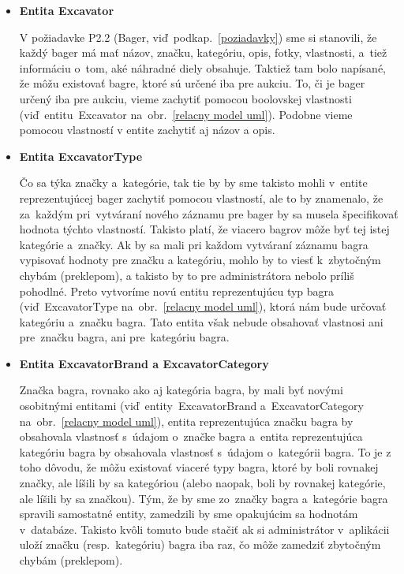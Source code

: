 \begin{itemize}
\item \textbf{Entita Excavator}

V požiadavke P2.2 (Bager, viď~podkap.~\ref{poziadavky}) sme si stanovili, že každý bager má mať názov, značku, kategóriu, opis, fotky, vlastnosti, a~tiež informáciu o~tom, aké náhradné diely obsahuje. Taktiež tam bolo napísané, že môžu existovať bagre, ktoré sú určené iba pre aukciu. To, či je bager určený iba pre aukciu, vieme zachytiť pomocou boolovskej vlastnosti (viď~entitu~Excavator na~obr.~\ref{relacny model uml}). Podobne vieme pomocou vlastností v entite zachytiť aj názov a opis.

\item \textbf{Entita ExcavatorType}

Čo sa týka značky a~kategórie, tak tie by by sme takisto mohli v~entite reprezentujúcej bager zachytiť pomocou vlastností, ale to by znamenalo, že za~každým pri~vytváraní nového záznamu pre bager by sa musela špecifikovať hodnota týchto vlastností. Takisto platí, že viacero bagrov môže byť tej istej kategórie a~značky. Ak by sa mali pri každom vytváraní záznamu bagra vypisovať hodnoty pre značku a kategóriu, mohlo by to viesť k~zbytočným chybám (preklepom), a takisto by to pre administrátora nebolo príliš pohodlné. Preto vytvoríme novú entitu reprezentujúcu typ bagra (viď~ExcavatorType na~obr.~\ref{relacny model uml}), ktorá nám bude určovať kategóriu a~značku bagra. Tato entita však nebude obsahovať vlastnosi ani pre~značku bagra, ani pre~kategóriu bagra.

\item \textbf{Entita ExcavatorBrand a ExcavatorCategory}

Značka bagra, rovnako ako aj kategória bagra, by mali byť novými osobitnými entitami (viď~entity~ExcavatorBrand a~ExcavatorCategory na~obr.~\ref{relacny model uml}), entita reprezentujúca značku bagra by obsahovala vlastnosť s~údajom o~značke bagra a~entita reprezentujúca kategóriu bagra by obsahovala vlastnosť s~údajom o~kategórii bagra. To je z toho dôvodu, že môžu existovať viaceré typy bagra, ktoré by boli rovnakej značky, ale líšili by sa kategóriou (alebo naopak, boli by rovnakej kategórie, ale líšili by sa značkou). Tým, že by sme zo~značky bagra a~kategórie bagra spravili samostatné entity, zamedzili by sme opakujúcim sa hodnotám v~databáze. Takisto kvôli tomuto bude stačiť ak si administrátor v~aplikácii uloží značku (resp.~kategóriu) bagra iba raz, čo môže zamedziť zbytočným chybám (preklepom).


\end{itemize}
